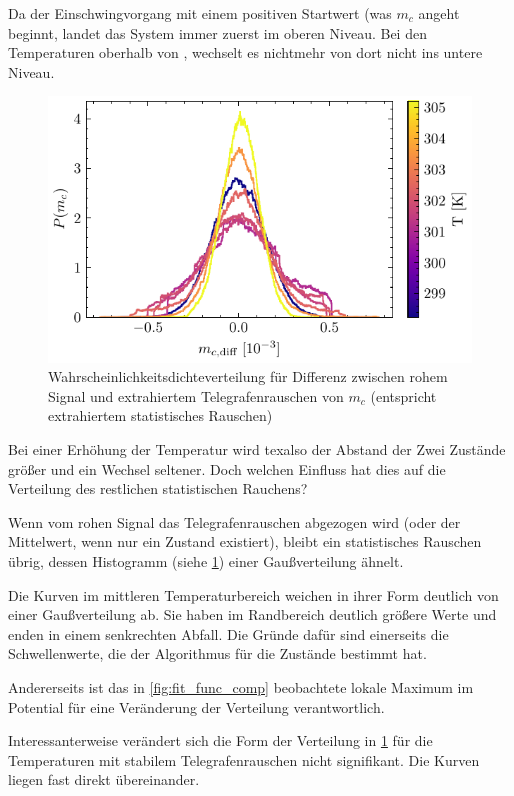 \documentclass[main.tex]{subfiles}
\begin{document}
Da der Einschwingvorgang mit einem positiven Startwert (was \(m_c\) angeht beginnt, landet das System immer zuerst im oberen Niveau. Bei den Temperaturen oberhalb von , wechselt es nichtmehr von dort nicht ins untere Niveau. 

\begin{figure}[H]
    \centering
    \includegraphics{bilder/plots/temp_comparison_long/mc_diff_hist.pdf}
    \caption{Wahrscheinlichkeitsdichteverteilung für Differenz zwischen rohem Signal und extrahiertem Telegrafenrauschen von \(m_c\) (entspricht extrahiertem statistisches Rauschen)}\label{fig:temp-diff-hist}    
\end{figure}

Bei einer Erhöhung der Temperatur wird texalso der Abstand der Zwei Zustände größer und ein Wechsel seltener. Doch welchen Einfluss hat dies auf die Verteilung des restlichen statistischen Rauchens?

Wenn vom rohen Signal das Telegrafenrauschen abgezogen wird (oder der Mittelwert, wenn nur ein Zustand existiert), bleibt ein statistisches Rauschen übrig, dessen Histogramm (siehe \cref{fig:temp-diff-hist}) einer Gaußverteilung ähnelt.

Die Kurven im mittleren Temperaturbereich weichen in ihrer Form deutlich von einer Gaußverteilung ab. Sie haben im Randbereich deutlich größere Werte und enden in einem senkrechten Abfall. Die Gründe dafür sind einerseits die Schwellenwerte, die der Algorithmus für die Zustände bestimmt hat. 

Andererseits ist das in \cref{fig:fit_func_comp} beobachtete lokale Maximum im Potential für eine Veränderung der Verteilung verantwortlich. 

Interessanterweise verändert sich die Form der Verteilung in \cref{fig:temp-diff-hist} für die Temperaturen mit stabilem Telegrafenrauschen nicht signifikant. Die Kurven liegen fast direkt übereinander.
\end{document}
